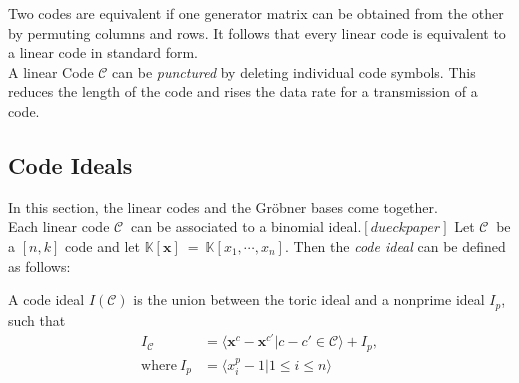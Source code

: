 Two codes are equivalent if one generator matrix can be obtained from the other by permuting columns and rows.
It follows that every linear code is equivalent to a linear code in standard form.\cite{dueckjournal} \\

A linear Code $\mathcal{C}$ can be \textit{punctured} by deleting individual code symbols.
This reduces the length of the code and rises the data rate for a transmission of a code.


\subsection{Code Ideals}
\label{subsec:codeideals}
In this section, the linear codes and the Gröbner bases come together.\\
Each linear code $\mathcal{C}~$ can be associated to a binomial ideal.$[dueckpaper]$ Let $\mathcal{C}~$ be a $[n,k]$ code and let 
$\mathbb{K}[\textbf{x}]~=~\mathbb{K}[x_{1},\cdots,x_{n}]$.
Then the \textit{code ideal} can be defined as follows:

\begin{env_definition}
\cite{dueckpaper} A code ideal $I(\mathcal{C})$ is the union between the toric ideal and a nonprime ideal $I_{p}$, such that
\begin{align*}
 I_{\mathcal{C}} & = \langle \textbf{x}^{c} - \textbf{x}^{c'} | c - c' \in \mathcal{C}  \rangle + I_{p},\\
\textrm{where} ~ I_{p} & = \langle x_{i}^{p} - 1 | 1 \leq i \leq n \rangle 
\end{align*}
\end{env_definition}

\newpage

